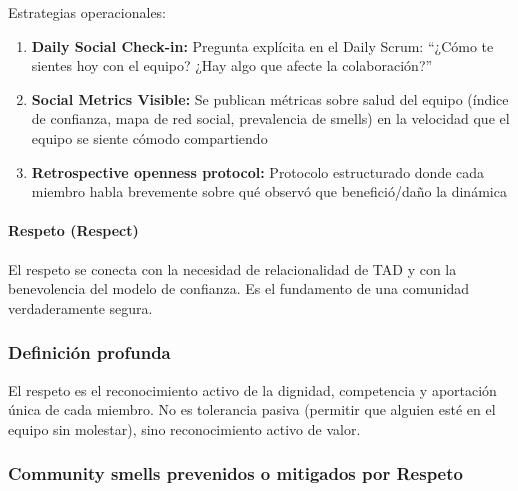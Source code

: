 Estrategias operacionales:
\begin{enumerate}
\item \textbf{Daily Social Check-in:} Pregunta explícita en el Daily Scrum: ``¿Cómo te sientes hoy con el equipo? ¿Hay algo que afecte la colaboración?''
\item \textbf{Social Metrics Visible:} Se publican métricas sobre salud del equipo (índice de confianza, mapa de red social, prevalencia de smells) en la velocidad que el equipo se siente cómodo compartiendo
\item \textbf{Retrospective openness protocol:} Protocolo estructurado donde cada miembro habla brevemente sobre qué observó que benefició/daño la dinámica
\end{enumerate}

\paragraph{Respeto (Respect)}

El respeto se conecta con la necesidad de relacionalidad de TAD y con la benevolencia del modelo de confianza. Es el fundamento de una comunidad verdaderamente segura.

\subsubsection*{Definición profunda}

El respeto es el reconocimiento activo de la dignidad, competencia y aportación única de cada miembro. No es tolerancia pasiva (permitir que alguien esté en el equipo sin molestar), sino reconocimiento activo de valor.

\subsubsection*{Community smells prevenidos o mitigados por Respeto}

